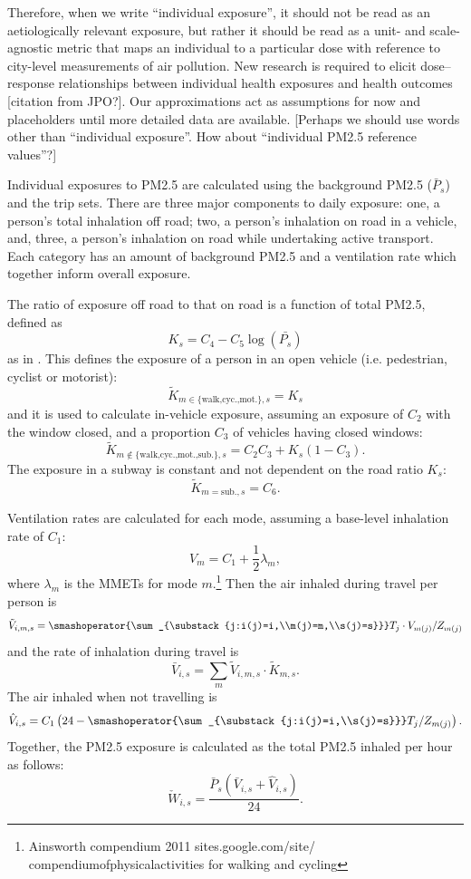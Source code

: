 \documentclass{article}
\begin{document}
Therefore, when we write ``individual exposure'', it should not be read as an aetiologically relevant exposure, but rather it should be read as a unit- and scale-agnostic metric that maps an individual to a particular dose with reference to city-level measurements of air pollution. New research is required to elicit dose--response relationships between individual health exposures and health outcomes [citation from JPO?]. Our approximations act as assumptions for now and placeholders until more detailed data are available. [Perhaps we should use words other than ``individual exposure''. How about ``individual PM2.5 reference values''?]

\bigskip

Individual exposures to PM2.5 are calculated using the background PM2.5 ($\bar{P}_s$)  and the trip sets. There are three major components to daily exposure: one, a person's total inhalation off road; two, a person's inhalation on road in a vehicle, and, three, a person's inhalation on road while undertaking active transport. Each category has an amount of background PM2.5 and a ventilation rate which together inform overall exposure.

The ratio of exposure off road to that on road is a function of total PM2.5, defined as
$$K_s=C_4-C_5\log(\bar{P_s})$$
as in \citet{Goel2015}. This defines the exposure of a person in an open vehicle (i.e. pedestrian, cyclist or motorist):
$$\tilde{K}_{m\in\{\text{walk,cyc.,mot.}\},s}=K_s$$
and it is used to calculate in-vehicle exposure, assuming an exposure of $C_2$ with the window closed, and a proportion $C_3$ of vehicles having closed windows:%
$$\tilde{K}_{m\not\in\{\text{walk,cyc.,mot.,sub.}\},s}=C_2C_3+K_s(1-C_3).$$
The exposure in a subway is constant and not dependent on the road ratio $K_s$:
$$\tilde{K}_{m=\text{sub.},s}=C_6.$$

Ventilation rates are calculated for each mode, assuming a base-level inhalation rate of $C_1$:
$$V_m=C_1+\frac{1}{2}\lambda_m,$$
where $\lambda_m$ is the MMETs for mode $m$.\footnote{Ainsworth compendium 2011 sites.google.com/site/ compendiumofphysicalactivities for walking and cycling} Then the air inhaled during travel per person is
$$\tilde{V}_{i,m,s} = \smashoperator{\sum_{\substack{j:i(j)=i,\\m(j)=m,\\s(j)=s}}}T_j\cdot V_{m(j)}/Z_{m(j)}$$
and the rate of inhalation during travel is
$$\bar{V}_{i,s} = \sum_{m}\tilde{V}_{i,m,s}\cdot \tilde{K}_{m,s}.$$
The air inhaled when not travelling is
$$\hat{V}_{i,s} = C_1\left(24-\smashoperator{\sum_{\substack{j:i(j)=i,\\s(j)=s}}}T_j/Z_{m(j)}\right).$$
Together, the PM2.5 exposure is calculated as the total PM2.5 inhaled per hour %
as follows:
$$\check{W}_{i,s} = \frac{\bar{P}_s(\bar{V}_{i,s}+\hat{V}_{i,s})}{24}.$$
\end{document}
